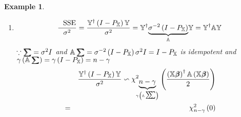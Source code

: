 \documentclass{article}
\newtheorem{example}[theorem]{Example}
\begin{document}
\begin{example}
\begin{enumerate}
\item 
\begin{equation*}
\frac{\text{SSE}}{\sigma ^{2}}=\frac{\mathbb{Y}^{\dagger }\left( I-P_{%
\mathbb{X}}\right) \mathbb{Y}}{\sigma ^{2}}=\mathbb{Y}^{\dagger }\underset{%
\mathbb{A}}{\underbrace{\sigma ^{-2}\left( I-P_{\mathbb{X}}\right) }}\mathbb{%
Y=Y}^{\dagger }\mathbb{AY}
\end{equation*}%
$\because 
\tsum\mkern-20mu\tsum%
=\sigma ^{2}I$ and $\mathbb{A}%
\tsum\mkern-20mu\tsum%
=\sigma ^{-2}\left( I-P_{\mathbb{X}}\right) \sigma ^{2}I=I-P_{\mathbb{X}}$
is idempotent and $\gamma \left( \mathbb{A}%
\tsum\mkern-20mu\tsum%
\right) =\gamma \left( I-P_{\mathbb{X}}\right) =n-\gamma $%
\begin{eqnarray*}
&\therefore &\frac{\mathbb{Y}^{\dagger }\left( I-P_{\mathbb{X}}\right) 
\mathbb{Y}}{\sigma ^{2}}\backsim \chi _{\underset{\gamma \left( \mathbb{A}%
\tsum\mkern-20mu\tsum%
\right) }{\underbrace{n-\gamma }}}^{2}\left( \frac{\left( \mathbb{X}%
\beta\mkern-9.6mu \beta%
\right) ^{\dagger }\mathbb{A}\left( \mathbb{X}%
\beta\mkern-9.6mu \beta%
\right) }{2}\right)  \\
&=&\chi _{n-\gamma }^{2}\left( 0\right) 
\end{eqnarray*}


\end{enumerate}
\end{example}
\end{document}
